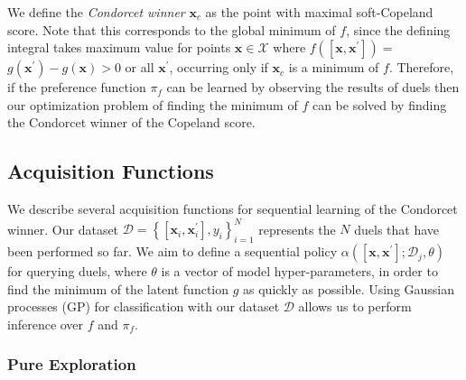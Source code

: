 \documentclass[
  letterpaper,
  DIV=11,
  numbers=noendperiod,
  oneside]{scrreprt}
\theoremstyle{remark}
\begin{document}
We define the \emph{Condorcet winner} \(\mathbf{x}_c\) as the point with
maximal soft-Copeland score. Note that this corresponds to the global
minimum of \(f\), since the defining integral takes maximum value for
points \(\mathbf{x} \in \mathcal{X}\) where
\(f\left(\left[\mathbf{x}, \mathbf{x}^{\prime}\right]\right)=\)
\(g\left(\mathbf{x}^{\prime}\right)-g(\mathbf{x})>0\) or all
\(\mathbf{x}^{\prime}\), occurring only if \(\mathbf{x}_c\) is a minimum
of \(f\). Therefore, if the preference function \(\pi_f\) can be learned
by observing the results of duels then our optimization problem of
finding the minimum of \(f\) can be solved by finding the Condorcet
winner of the Copeland score.

\subsection{Acquisition Functions}\label{acquisition-functions-1}

We describe several acquisition functions for sequential learning of the
Condorcet winner. Our dataset
\(\mathcal{D}=\left\{\left[\mathbf{x}_i, \mathbf{x}_i^{\prime}\right], y_i\right\}_{i=1}^N\)
represents the \(N\) duels that have been performed so far. We aim to
define a sequential policy
\(\alpha\left(\left[\mathbf{x}, \mathbf{x}^{\prime}\right] ; \mathcal{D}_j, \theta\right)\)
for querying duels, where \(\theta\) is a vector of model
hyper-parameters, in order to find the minimum of the latent function
\(g\) as quickly as possible. Using Gaussian processes (GP) for
classification with our dataset \(\mathcal{D}\) allows us to perform
inference over \(f\) and \(\pi_f\).

\subsubsection*{Pure Exploration}\label{pure-exploration}
\end{document}
